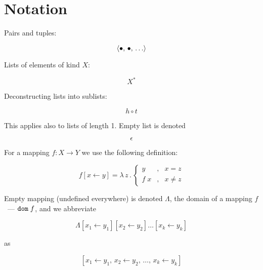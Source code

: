 \section{Notation}

Pairs and tuples:

\[
\left<{\bullet,\,\bullet,\,\dots}\right>
\]

Lists of elements of kind $X$:

\[
X^*
\]

Deconstructing lists into sublists:

\[
h\circ t
\]

This applies also to lists of length 1. Empty list is denoted

\[
  \epsilon
\]


For a mapping $f : X\to Y$ we use the following definition:

\[
f [x\gets y] = \lambda\,z\,.\,
\left\{
\begin{array}{rcl}
  y    &,& x = z \\
  f\;x &,& x\neq z
\end{array}
\right.
\]

Empty mapping (undefined everywhere) is denoted $\Lambda$, the domain of a mapping $f$~--- $\mathtt{dom}\;{f}$, and we abbreviate

\[
  \Lambda[x_1\gets y_1][x_2\gets y_2]\dots[x_k\gets y_k]
\]

as

\[
  [x_1\gets y_1,\,x_2\gets y_2,\,\dots,\,x_k\gets y_k]
\]
